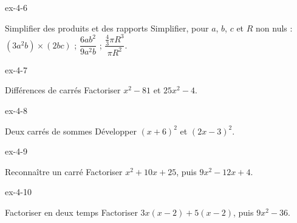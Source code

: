 \clearpage{}
\begin{blocLivre}{ex-4-6}\begin{exercice}[2]{Simplifier des produits et des rapports}
Simplifier, pour $a$, $b$, $c$ et $R$ non nuls : $(3a^2b)\times(2bc)$ ; $\dfrac{6ab^2}{9a^2b}$ ; $\dfrac{\frac43\pi R^3}{\pi R^2}$.
\end{exercice}\end{blocLivre}
\begin{blocLivre}{ex-4-7}\begin{exercice}[2]{Différences de carrés}
Factoriser $x^2-81$ et $25x^2-4$.
\end{exercice}\end{blocLivre}
\begin{blocLivre}{ex-4-8}\begin{exercice}[2]{Deux carrés de sommes}
Développer $(x+6)^2$ et $(2x-3)^2$.
\end{exercice}\end{blocLivre}
\begin{blocLivre}{ex-4-9}\begin{exercice}[2]{Reconnaître un carré}
Factoriser $x^2+10x+25$, puis $9x^2-12x+4$.
\end{exercice}\end{blocLivre}
\begin{blocLivre}{ex-4-10}\begin{exercice}[2]{Factoriser en deux temps}
Factoriser $3x(x-2)+5(x-2)$, puis $9x^2-36$.
\end{exercice}\end{blocLivre}

